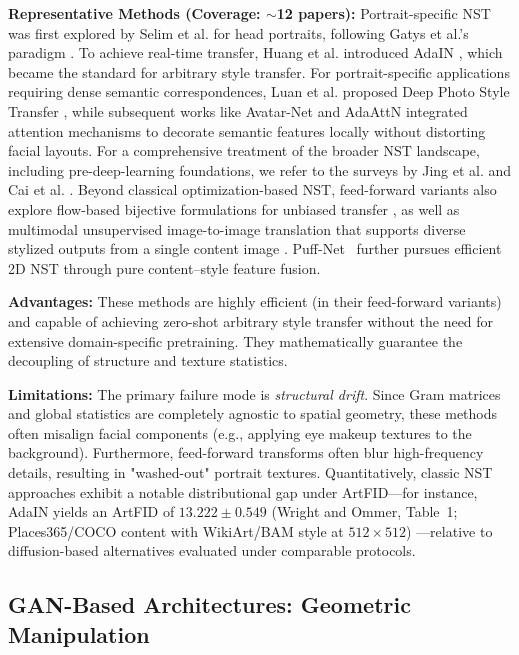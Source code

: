 \documentclass[journal]{IEEEtran}
\begin{document}
\textbf{Representative Methods (Coverage: $\sim$12 papers):} Portrait-specific NST was first explored by Selim et al. \cite{selim2016portrait} for head portraits, following Gatys et al.'s paradigm \cite{gatys2015ana}. To achieve real-time transfer, Huang et al. introduced AdaIN \cite{huang2017arbitraryst}, which became the standard for arbitrary style transfer. For portrait-specific applications requiring dense semantic correspondences, Luan et al. proposed Deep Photo Style Transfer \cite{luan2017deepps}, while subsequent works like Avatar-Net \cite{avatar-net} and AdaAttN \cite{liu2021adaattnra} integrated attention mechanisms to decorate semantic features locally without distorting facial layouts. For a comprehensive treatment of the broader NST landscape, including pre-deep-learning foundations, we refer to the surveys by Jing et al. \cite{jing2020neural} and Cai et al. \cite{cai2023imagestyle}. Beyond classical optimization-based NST, feed-forward variants also explore flow-based bijective formulations for unbiased transfer \cite{artflow}, as well as multimodal unsupervised image-to-image translation that supports diverse stylized outputs from a single content image \cite{huang2018multimodal}. Puff-Net~\cite{zheng2024puffnet} further pursues efficient 2D NST through pure content--style feature fusion.

\textbf{Advantages:} These methods are highly efficient (in their feed-forward variants) and capable of achieving zero-shot arbitrary style transfer without the need for extensive domain-specific pretraining. They mathematically guarantee the decoupling of structure and texture statistics.

\textbf{Limitations:} The primary failure mode is \textit{structural drift}. Since Gram matrices and global statistics are completely agnostic to spatial geometry, these methods often misalign facial components (e.g., applying eye makeup textures to the background). Furthermore, feed-forward transforms often blur high-frequency details, resulting in "washed-out" portrait textures. Quantitatively, classic NST approaches exhibit a notable distributional gap under ArtFID---for instance, AdaIN yields an ArtFID of $13.222 \pm 0.549$ (Wright and Ommer, Table~1; Places365/COCO content with WikiArt/BAM style at $512\times512$) \cite{wright2022artfidqe}---relative to diffusion-based alternatives evaluated under comparable protocols.

\subsection{GAN-Based Architectures: Geometric Manipulation}
\label{sec:methodology:gan}
\end{document}
